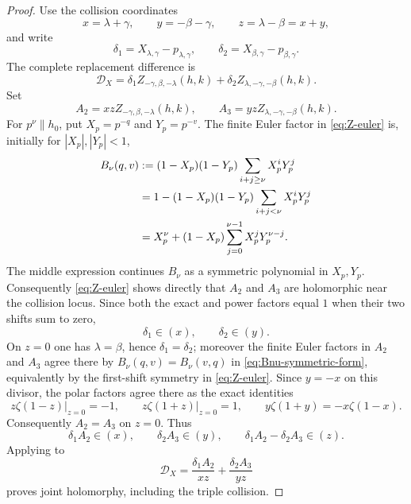 \begin{proof}
Use the collision coordinates
\[
 x=\lambda+\gamma,\qquad y=-\beta-\gamma,
 \qquad z=\lambda-\beta=x+y,
\]
and write
\[
 \delta_1=X_{\lambda,\gamma}-p_{\lambda,\gamma},
 \qquad
 \delta_2=X_{\beta,\gamma}-p_{\beta,\gamma}.
\]
The complete replacement difference is
\begin{equation}\label{eq:complete-stirling-difference}
 \mathscr D_X
 =\delta_1Z_{-\gamma,\beta,-\lambda}(h,k)
  +\delta_2Z_{\lambda,-\gamma,-\beta}(h,k).
\end{equation}
Set
\[
 A_2=xzZ_{-\gamma,\beta,-\lambda}(h,k),
 \qquad
 A_3=yzZ_{\lambda,-\gamma,-\beta}(h,k).
\]
For $p^\nu\parallel h_0$, put $X_p=p^{-q}$ and $Y_p=p^{-v}$.  The finite
Euler factor in \eqref{eq:Z-euler} is, initially for
$|X_p|,|Y_p|<1$,
\begin{align}
 B_\nu(q,v)
 &:=(1-X_p)(1-Y_p)\sum_{i+j\geq\nu}X_p^iY_p^j \notag\\
 &=1-(1-X_p)(1-Y_p)\sum_{i+j<\nu}X_p^iY_p^j \notag\\
 &=X_p^\nu+(1-X_p)\sum_{j=0}^{\nu-1}X_p^jY_p^{\nu-j}.
 \label{eq:Bnu-symmetric-form}
\end{align}
The middle expression continues $B_\nu$ as a symmetric polynomial in
$X_p,Y_p$.  Consequently \eqref{eq:Z-euler} shows directly that $A_2$ and
$A_3$ are holomorphic near the collision locus.  Since both the exact and
power factors equal $1$ when their two shifts sum to zero,
\[
 \delta_1\in(x),\qquad \delta_2\in(y).
\]
On $z=0$ one has $\lambda=\beta$, hence $\delta_1=\delta_2$; moreover the
finite Euler factors in $A_2$ and $A_3$ agree there by
$B_\nu(q,v)=B_\nu(v,q)$ in \eqref{eq:Bnu-symmetric-form}, equivalently by
the first-shift symmetry in \eqref{eq:Z-euler}.  Since $y=-x$ on this
divisor, the polar factors agree there as the exact identities
\[
 \left.z\zeta(1-z)\right|_{z=0}=-1,
 \qquad
 \left.z\zeta(1+z)\right|_{z=0}=1,
 \qquad
 y\zeta(1+y)=-x\zeta(1-x).
\]
Consequently $A_2=A_3$ on $z=0$.
Thus
\[
 \delta_1A_2\in(x),\qquad
 \delta_2A_3\in(y),\qquad
 \delta_1A_2-\delta_2A_3\in(z).
\]
Applying  to
\[
 \mathscr D_X=\frac{\delta_1A_2}{xz}
              +\frac{\delta_2A_3}{yz}
\]
proves joint holomorphy, including the triple collision.


\end{proof}
